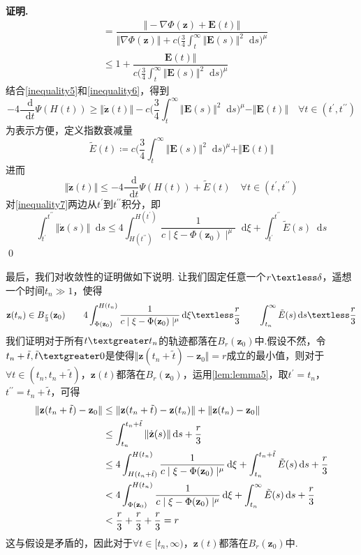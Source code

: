\documentclass[11pt,a4paper]{article}
\newcommand*{\dif}{\mathop{}\!\mathrm{d}}%
\theoremstyle{definition}
\renewenvironment{proof}{\par\textbf{证明.}\;}{\qed\par}
\begin{document}
\begin{proof}
\begin{align}
	 		&=\dfrac{\Vert-\nabla\Phi(\textbf{z})+\textbf{E}(t)\Vert}{\Vert\nabla\Phi(\textbf{z})\Vert+c\Big(\frac{3}{4}\int_{t}^{\infty}\Vert\textbf{E}(s)\Vert^{2}\dif s\Big)^{\mu}}\nonumber\\
	 		&\leq1+\dfrac{\textbf{E}(t)\Vert}{c\Big(\frac{3}{4}\int_{t}^{\infty}\Vert\textbf{E}(s)\Vert^{2}\dif s\Big)^{\mu}}\label{inequality6}
	 	\end{align}
	 	结合\eqref{inequality5}和\eqref{inequality6}，得到\[ 	-4\dfrac{\dif}{\dif t}\Psi(H(t))\geq\Vert\dot{\textbf{z}}(t)\Vert-c\Big(\frac{3}{4}\int_{t}^{\infty}\Vert\textbf{E}(s)\Vert^{2}\dif s\Big)^{\mu}-\Vert\textbf{E}(t)\Vert\quad\forall t\in(t^{\prime},t^{\prime\prime}) \]
	 	为表示方便，定义指数衰减量\[ \tilde{E}(t)\coloneqq c\Big(\frac{3}{4}\int_{t}^{\infty}\Vert\textbf{E}(s)\Vert^{2}\dif s\Big)^{\mu}+\Vert\textbf{E}(t)\Vert \]
	 	进而
	 	\begin{equation}\label{inequality7}
	 		\Vert\dot{\textbf{z}}(t)\Vert\leq-4\dfrac{\dif}{\dif t}\Psi(H(t))+\tilde{E}(t)\quad\forall t\in(t^{\prime},t^{\prime\prime})
	 	\end{equation}
	 	对\eqref{inequality7}两边从$t^{\prime}$到$t^{\prime\prime}$积分，即\[ \int_{t^{\prime}}^{t^{\prime\prime}}\Vert\dot{\textbf{z}}(s)\Vert\dif s\leq4\int_{H(t^{\prime\prime})}^{H(t^{\prime})}\dfrac{1}{c\mid\xi-\Phi(\textbf{z}_{0})\mid^{\mu}}\dif\xi+\int_{t^{\prime}}^{t^{\prime\prime}}\tilde{E}(s)\dif s \]
	\end{proof}
	最后，我们对收敛性的证明做如下说明.	
	让我们固定任意一个$r\textless\delta$，遥想一个时间$t_{n}\gg1$，使得\[ \textbf{z}(t_{n})\in B_{\frac{r}{3}}(\textbf{z}_{0})\qquad4\int_{\Phi(\textbf{z}_{0})}^{H(t_{n})}\dfrac{1}{c\mid\xi-\Phi(\textbf{z}_{0})\mid^{\mu}}\dif\xi\textless\dfrac{r}{3}\qquad\int_{t_{n}}^{\infty}\tilde{E}(s)\dif s\textless\dfrac{r}{3} \]
	我们证明对于所有$t\textgreater t_{n}$的轨迹都落在$B_{r}(\textbf{z}_{0})$中.假设不然，令$t_{n}+\tilde{t},\tilde{t}\textgreater0$是使得$\Vert\textbf{z}(t_{n}+\tilde{t})-\textbf{z}_{0}\Vert=r$成立的最小值，则对于$\forall t\in(t_{n},t_{n}+\tilde{t})$，$\textbf{z}(t)$都落在$B_{r}(\textbf{z}_{0})$，运用\eqref{lem:lemma5}，取$t^{\prime}=t_{n}$，$t^{\prime\prime}=t_{n}+\tilde{t}$，可得
	\begin{align*}
		\Vert\textbf{z}(t_{n}+\tilde{t})-\textbf{z}_{0}\Vert&\leq\Vert\textbf{z}(t_{n}+\tilde{t})-\textbf{z}(t_{n})\Vert+\Vert\textbf{z}(t_{n})-\textbf{z}_{0}\Vert\\
		&\leq\int_{t_{n}}^{t_{n}+\tilde{t}}\Vert\dot{\textbf{z}}(s)\Vert\dif s+\dfrac{r}{3}\\
		&\leq4\int_{H(t_{n}+\tilde{t})}^{H(t_{n})}\dfrac{1}{c\mid\xi-\Phi(\textbf{z}_{0})\mid^{\mu}}\dif\xi+\int_{t_{n}}^{t_{n}+\tilde{t}}\tilde{E}(s)\dif s+\dfrac{r}{3}\\
		&\textless4\int_{\Phi(\textbf{z}_{0})}^{H(t_{n})}\dfrac{1}{c\mid\xi-\Phi(\textbf{z}_{0})\mid^{\mu}}\dif\xi+\int_{t_{n}}^{\infty}\tilde{E}(s)\dif s+\dfrac{r}{3}\\
		&\textless\dfrac{r}{3}+\dfrac{r}{3}+\dfrac{r}{3}=r
	\end{align*}
	这与假设是矛盾的，因此对于$\forall t\in[t_{n},\infty)$，$\textbf{z}(t)$都落在$B_{r}(\textbf{z}_{0})$中.
	
\end{document}
